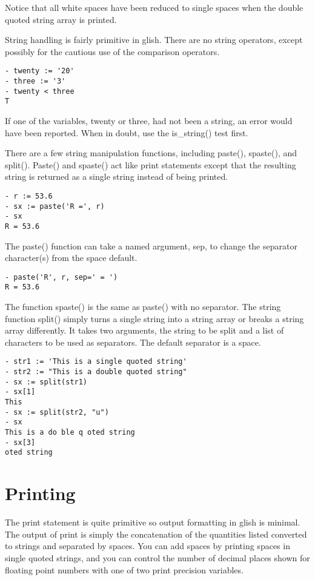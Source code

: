 Notice that all white spaces have been reduced to single spaces when the
double quoted string array is printed.

    String handling is fairly primitive in glish.  There are no string
operators, except possibly for the cautious use of the comparison
operators.

\begin{verbatim}
- twenty := '20'
- three := '3'
- twenty < three
T
\end{verbatim}

If one of the variables, twenty or three, had not been a string, an
error would have been reported.  When in doubt, use the is\_string() test
first.

    There are a few string manipulation functions, including paste(), 
spaste(), and
split().  Paste() and spaste() act like print statements except that the
resulting string is returned as a single string instead of being printed.

\begin{verbatim}
- r := 53.6
- sx := paste('R =', r)
- sx
R = 53.6
\end{verbatim}

The paste() function can take a named argument, sep, to change the
separator character(s) from the space default.

\begin{verbatim}
- paste('R', r, sep=' = ')
R = 53.6
\end{verbatim}

The function spaste() is the same as paste() with no separator.
The string function split() simply turns a single string into a
string array or breaks a string array differently.  It takes two arguments,
the string to be split and a list of characters to be used as separators.
The default separator is a space.

\begin{verbatim}
- str1 := 'This is a single quoted string'
- str2 := "This is a double quoted string"
- sx := split(str1)
- sx[1]
This
- sx := split(str2, "u")
- sx
This is a do ble q oted string
- sx[3]
oted string
\end{verbatim}

\section{Printing}

    The print statement is quite primitive so output formatting in glish is
minimal.  The output of print is simply the concatenation of the quantities
listed converted to strings and separated by spaces.  You can add spaces by
printing spaces in single quoted strings, and you can control the number of
decimal places shown for floating point numbers with one of two print
precision variables.


